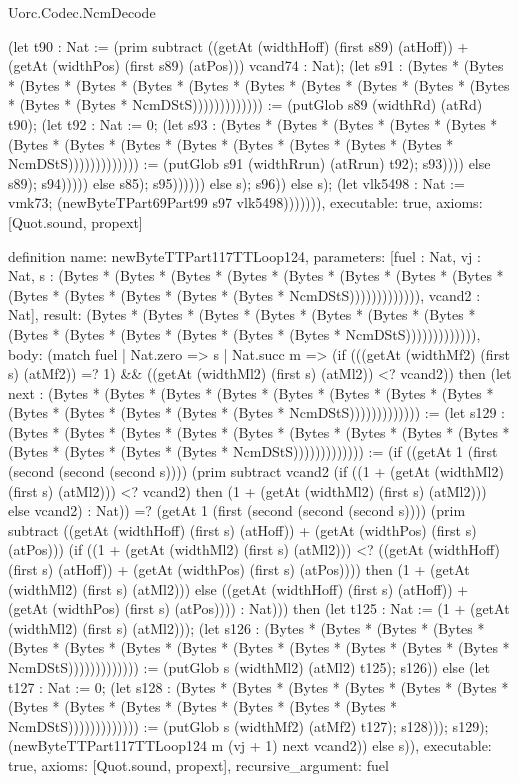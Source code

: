 \begin{lexlean}{Uorc.Codec.NcmDecode}
\begin{semanticmodule}
{(let t90 : Nat := (prim subtract ((getAt (widthHoff) (first s89) (atHoff)) + (getAt (widthPos) (first s89) (atPos))) vcand74 : Nat); (let s91 : (Bytes * (Bytes * (Bytes * (Bytes * (Bytes * (Bytes * (Bytes * (Bytes * (Bytes * (Bytes * (Bytes * (Bytes * (Bytes * NcmDStS))))))))))))) := (putGlob s89 (widthRd) (atRd) t90); (let t92 : Nat := 0; (let s93 : (Bytes * (Bytes * (Bytes * (Bytes * (Bytes * (Bytes * (Bytes * (Bytes * (Bytes * (Bytes * (Bytes * (Bytes * (Bytes * NcmDStS))))))))))))) := (putGlob s91 (widthRrun) (atRrun) t92); s93)))) else s89); s94))))) else s85); s95)))))) else s); s96)) else s); (let vlk5498 : Nat := vmk73; (newByteTPart69Part99 s97 vlk5498))))))),
  executable: true,
  axioms: [Quot.sound, propext]
}

definition{
  name: newByteTTPart117TTLoop124,
  parameters: [fuel : Nat, vj : Nat, s : (Bytes * (Bytes * (Bytes * (Bytes * (Bytes * (Bytes * (Bytes * (Bytes * (Bytes * (Bytes * (Bytes * (Bytes * (Bytes * NcmDStS))))))))))))), vcand2 : Nat],
  result: (Bytes * (Bytes * (Bytes * (Bytes * (Bytes * (Bytes * (Bytes * (Bytes * (Bytes * (Bytes * (Bytes * (Bytes * (Bytes * NcmDStS))))))))))))),
  body: (match fuel
    | Nat.zero => s
    | Nat.succ m => (if (((getAt (widthMf2) (first s) (atMf2)) =? 1) && ((getAt (widthMl2) (first s) (atMl2)) <? vcand2)) then (let next : (Bytes * (Bytes * (Bytes * (Bytes * (Bytes * (Bytes * (Bytes * (Bytes * (Bytes * (Bytes * (Bytes * (Bytes * (Bytes * NcmDStS))))))))))))) := (let s129 : (Bytes * (Bytes * (Bytes * (Bytes * (Bytes * (Bytes * (Bytes * (Bytes * (Bytes * (Bytes * (Bytes * (Bytes * (Bytes * NcmDStS))))))))))))) := (if ((getAt 1 (first (second (second (second s)))) (prim subtract vcand2 (if ((1 + (getAt (widthMl2) (first s) (atMl2))) <? vcand2) then (1 + (getAt (widthMl2) (first s) (atMl2))) else vcand2) : Nat)) =? (getAt 1 (first (second (second (second s)))) (prim subtract ((getAt (widthHoff) (first s) (atHoff)) + (getAt (widthPos) (first s) (atPos))) (if ((1 + (getAt (widthMl2) (first s) (atMl2))) <? ((getAt (widthHoff) (first s) (atHoff)) + (getAt (widthPos) (first s) (atPos)))) then (1 + (getAt (widthMl2) (first s) (atMl2))) else ((getAt (widthHoff) (first s) (atHoff)) + (getAt (widthPos) (first s) (atPos)))) : Nat))) then (let t125 : Nat := (1 + (getAt (widthMl2) (first s) (atMl2))); (let s126 : (Bytes * (Bytes * (Bytes * (Bytes * (Bytes * (Bytes * (Bytes * (Bytes * (Bytes * (Bytes * (Bytes * (Bytes * (Bytes * NcmDStS))))))))))))) := (putGlob s (widthMl2) (atMl2) t125); s126)) else (let t127 : Nat := 0; (let s128 : (Bytes * (Bytes * (Bytes * (Bytes * (Bytes * (Bytes * (Bytes * (Bytes * (Bytes * (Bytes * (Bytes * (Bytes * (Bytes * NcmDStS))))))))))))) := (putGlob s (widthMf2) (atMf2) t127); s128))); s129); (newByteTTPart117TTLoop124 m (vj + 1) next vcand2)) else s)),
  executable: true,
  axioms: [Quot.sound, propext],
  recursive_argument: fuel
}


\end{semanticmodule}
\end{lexlean}
